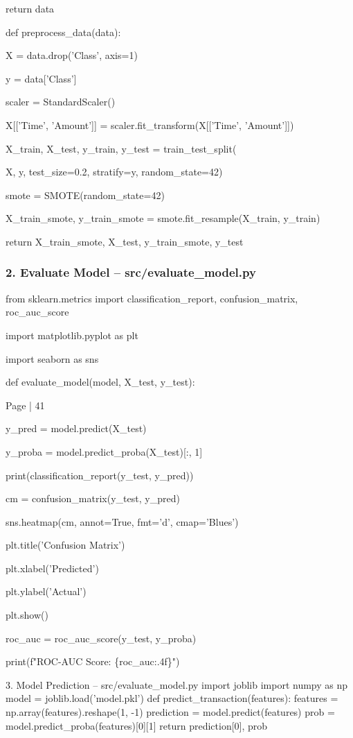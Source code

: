 \documentclass[11pt,a4paper]{article}
\begin{document}
    return data 

def preprocess\_data(data): 

    X = data.drop('Class', axis=1) 

    y = data['Class'] 

    scaler = StandardScaler() 

    X[['Time', 'Amount']] = scaler.fit\_transform(X[['Time', 'Amount']]) 

    X\_train, X\_test, y\_train, y\_test = train\_test\_split( 

        X, y, test\_size=0.2, stratify=y, random\_state=42) 

    smote = SMOTE(random\_state=42) 

    X\_train\_smote, y\_train\_smote = smote.fit\_resample(X\_train, y\_train) 

    return X\_train\_smote, X\_test, y\_train\_smote, y\_test 

\subsubsection*{2. Evaluate Model – src/evaluate\_model.py }

from sklearn.metrics import classification\_report, confusion\_matrix, roc\_auc\_score 

import matplotlib.pyplot as plt 

import seaborn as sns 

def evaluate\_model(model, X\_test, y\_test): 

Page | 41  

\newpage

    y\_pred = model.predict(X\_test) 

    y\_proba = model.predict\_proba(X\_test)[:, 1] 

    print(classification\_report(y\_test, y\_pred)) 

    cm = confusion\_matrix(y\_test, y\_pred) 

    sns.heatmap(cm, annot=True, fmt='d', cmap='Blues') 

    plt.title('Confusion Matrix') 

    plt.xlabel('Predicted') 

    plt.ylabel('Actual') 

    plt.show() 

    roc\_auc = roc\_auc\_score(y\_test, y\_proba) 

    print(f"ROC-AUC Score: \{roc\_auc:.4f\}") 

3. Model Prediction – src/evaluate\_model.py 
import joblib 
import numpy as np 
model = joblib.load('model.pkl') 
def predict\_transaction(features): 
    features = np.array(features).reshape(1, -1) 
    prediction = model.predict(features) 
    prob = model.predict\_proba(features)[0][1] 
    return prediction[0], prob 
\end{document}
